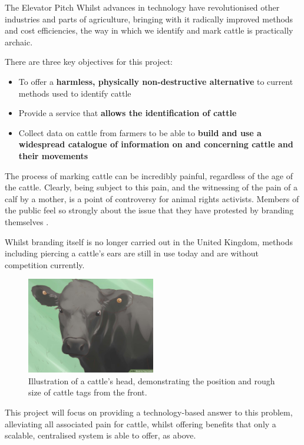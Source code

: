 

\begin{subsection}{The Elevator Pitch}
  Whilst advances in technology have revolutionised other industries and parts of agriculture, bringing with it radically improved methods and cost efficiencies, the way in which we identify and mark cattle is practically archaic.
  
  There are three key objectives for this project:
  
  \begin{itemize}
  	\item To offer a \textbf{harmless, physically non-destructive alternative} to current methods used to identify cattle
  	\item Provide a service that \textbf{allows the identification of cattle}
  	\item Collect data on cattle from farmers to be able to \textbf{build and use a widespread catalogue of information on and concerning cattle and their movements}
  \end{itemize}

  The process of marking cattle can be incredibly painful, regardless of the age of the cattle. Clearly, being subject to this pain, and the witnessing of the pain of a calf by a mother, is a point of controversy for animal rights activists. Members of the public feel so strongly about the issue that they have protested by branding themselves \cite{theguardian1}. 
  
  Whilst branding itself is no longer carried out in the United Kingdom, methods including piercing a cattle's ears are still in use today and are without competition currently. 

  \begin{figure}[H]
  	\centering
    \includegraphics[width=0.5\textwidth]{images/cattle-with-ear-tag.jpg}
  	\caption[Cattle ear tagging]{
      Illustration of a cattle's head, demonstrating the position and rough size of cattle tags from the front. \cite{wikihow1}
  	}
  \end{figure}
  
  This project will focus on providing a technology-based answer to this problem, alleviating all associated pain for cattle, whilst offering benefits that only a scalable, centralised system is able to offer, as above.
\end{subsection}

